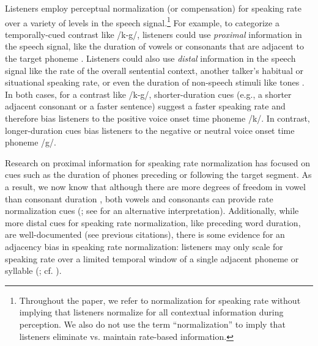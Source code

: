 Listeners employ perceptual normalization (or compensation) for speaking rate over a variety of levels in the speech signal.\footnote{Throughout the paper, we refer to normalization for speaking rate without implying that listeners normalize for all contextual information during perception. We also do not use the term ``normalization'' to imply that listeners eliminate vs. maintain rate-based information.} For example, to categorize a temporally-cued contrast like /k-g/, listeners could use \textit{proximal} information in the speech signal, like the duration of vowels or consonants that are adjacent to the target phoneme 
\citep{diehlAuditoryBasisStimulus1989,millerEffectsLateroccurringInformation1979,newmanPerceptualNormalizationSpeaking1996,summerfieldArticulatoryRatePerceptual1981}. Listeners could also use \textit{distal} information in the speech signal like the rate of the overall sentential context, another talker's habitual or situational speaking rate, or even the duration of non-speech stimuli like tones \citep{maslowskiHowTrackingHabitual2019, newmanPerceptualNormalizationSpeaking2009,reinischSpeakerspecificProcessingLocal2016,wadePerceptualEffectsPreceding2005}. In both cases, for a contrast like /k-g/, shorter-duration cues (e.g., a shorter adjacent consonant or a faster sentence) suggest a faster speaking rate and therefore bias listeners to the positive voice onset time phoneme /k/. In contrast, longer-duration cues bias listeners to the negative or neutral voice onset time phoneme /g/. 

Research on proximal information for speaking rate normalization has focused on cues such as the duration of phones preceding or following the target segment. As a result, we now know that although there are more degrees of freedom in vowel than consonant duration \citep{crystalSegmentalDurationsConnected1988}, both vowels and consonants can provide rate normalization cues (\citealt{diehlAuditoryBasisStimulus1989,summerfieldArticulatoryRatePerceptual1981}; see \citealt{toscanoCueintegrationContextEffects2012} for an alternative interpretation). Additionally, while more distal cues for speaking rate normalization, like preceding word duration, are well-documented (see previous citations), there is some evidence for an adjacency bias in speaking rate normalization: listeners may only scale for speaking rate over a limited temporal window of a single adjacent phoneme or syllable (\citealt{newmanPerceptualNormalizationSpeaking1996,sawuschPerceptualNormalizationSpeaking2000}; cf. \citealt{baese-berkLongTermTemporalTracking2014}). 

